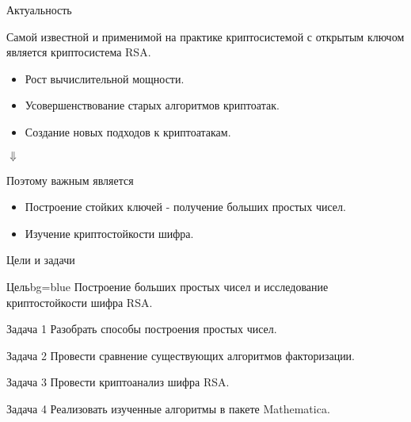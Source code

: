 
\begin{frame}{Актуальность}
	\begin{center}
		Самой известной и применимой на практике криптосистемой с открытым ключом является криптосистема RSA. \\

		\begin{itemize}
			\item Рост вычислительной мощности.
			\item Усовершенствование старых алгоритмов криптоатак.
			\item Создание новых подходов к криптоатакам.			
		\end{itemize}

		$\Downarrow$

		Поэтому важным является
		\begin{itemize}
			\item Построение стойких ключей - получение больших простых чисел.
			\item Изучение криптостойкости шифра.					
		\end{itemize}
	\end{center}
\end{frame}

\begin{frame}{Цели и задачи}	
	\begin{importantblock}{Цель}{}{bg=blue}
		Построение больших простых чисел и исследование криптостойкости шифра RSA.	
	\end{importantblock}	

	\begin{block}{Задача 1}
		Разобрать способы построения простых чисел.	
	\end{block}	

	\begin{block}{Задача 2}
		Провести сравнение существующих алгоритмов факторизации.
	\end{block}

	\begin{block}{Задача 3}
		Провести криптоанализ шифра RSA.
	\end{block}

	\begin{block}{Задача 4}
		Реализовать изученные алгоритмы в пакете Mathematica.
	\end{block}
		
\end{frame}